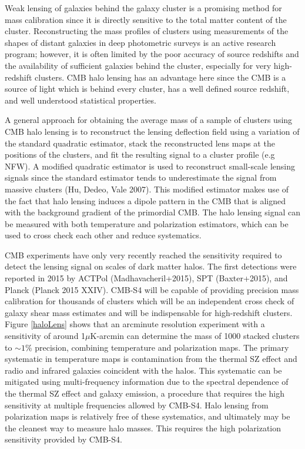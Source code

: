 \documentclass{tcibook}
\begin{document}
Weak lensing of galaxies behind the galaxy cluster is a promising method for mass calibration since it is directly sensitive to the total matter content of the cluster.  Reconstructing the mass profiles of clusters using measurements of the shapes of distant galaxies in deep photometric surveys is an active research program; however, it is often limited by the poor accuracy of source redshifts and the availability of sufficient galaxies behind the cluster, especially for very high-redshift clusters. CMB halo lensing has an advantage here since the CMB is a source of light which is behind every cluster, has a well defined source redshift, and well understood statistical properties.  

A general approach for obtaining the average mass of a sample of clusters using CMB halo lensing is to reconstruct the lensing deflection field using a variation of the standard quadratic estimator, stack the reconstructed lens maps at the positions of the clusters, and fit the resulting signal to a cluster profile (e.g NFW). A modified quadratic estimator is used to reconstruct small-scale lensing signals since the standard estimator tends to underestimate the signal from massive clusters (Hu, Dedeo, Vale 2007).  This modified estimator makes use of the fact that halo lensing induces a dipole pattern in the CMB that is aligned with the background gradient of the primordial CMB.  The halo lensing signal can be measured with both temperature and polarization estimators, which can be used to cross check each other and reduce systematics. 

CMB experiments have only very recently reached the sensitivity required to detect the lensing signal on scales of dark matter halos.  The first detections were reported in 2015 by ACTPol (Madhavacheril+2015), SPT (Baxter+2015), and Planck (Planck 2015 XXIV).  CMB-S4 will be capable of providing precision mass calibration for thousands of clusters which will be an independent cross check of galaxy shear mass estimates and will be indispensable for high-redshift clusters. Figure \ref{haloLens} shows that an arcminute resolution experiment with a sensitivity of around 1$\mu$K-arcmin can determine the mass of 1000 stacked clusters to $\sim 1\%$ precision, combining temperature and polarization maps. The primary systematic in temperature maps is contamination from the thermal SZ effect and radio and infrared galaxies coincident with the halos. This systematic can be mitigated using multi-frequency information due to the spectral dependence of the thermal SZ effect and galaxy emission, a procedure that requires the high sensitivity at multiple frequencies allowed by CMB-S4.  Halo lensing from polarization maps is relatively free of these systematics, and ultimately may be the cleanest way to measure halo masses.  This requires the high polarization sensitivity provided by CMB-S4. 
\end{document}
